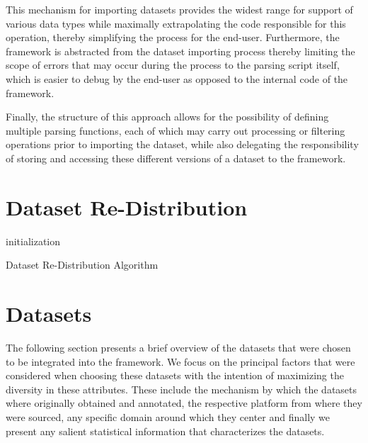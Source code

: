 \documentclass[12pt, a4paper]{report}
\theoremstyle{definition}
\theoremstyle{definition}%
\theoremstyle{definition}%
\theoremstyle{definition}%
\theoremstyle{definition}%
\theoremstyle{definition}%
\begin{document}
This mechanism for importing datasets provides the widest range for support of various data types while maximally extrapolating the code responsible for this operation, thereby simplifying the process for the end-user. Furthermore, the framework is abstracted from the dataset importing process thereby limiting the scope of errors that may occur during the process to the parsing script itself, which is easier to debug by the end-user as opposed to the internal code of the framework. 

Finally, the structure of this approach allows for the possibility of defining multiple parsing functions, each of which may carry out processing or filtering operations prior to importing the dataset, while also delegating the responsibility of storing and accessing these different versions of a dataset to the framework.

\section{Dataset Re-Distribution}
\begin{algorithm}[H]
\SetAlgoLined
{}
  initialization\;
\caption{Dataset Re-Distribution Algorithm}
\end{algorithm}

\section{Datasets}
The following section presents a brief overview of the datasets that were chosen to be integrated into the framework. We focus on the principal factors that were considered when choosing these datasets with the intention of maximizing the diversity in these attributes. These include the mechanism by which the datasets where originally obtained and annotated, the respective platform from where they were sourced, any specific domain around which they center and finally we present any salient statistical information that characterizes the datasets.
\end{document}
